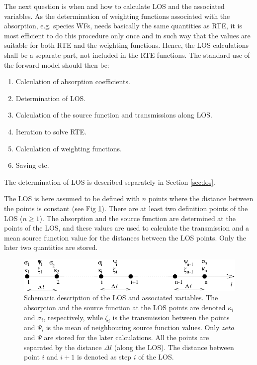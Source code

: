  The next question is when and how to calculate LOS and the associated
 variables. As the determination of weighting functions associated
 with the absorption, e.g. species WFs, needs basically the same
 quantities as RTE, it is most efficient to do this procedure only
 once and in such way that the values are suitable for both RTE and
 the weighting functions. Hence, the LOS calculations shall be a
 separate part, not included in the RTE functions. The standard use of
 the forward model should then be:
  \begin{enumerate}
    \item Calculation of absorption coefficients.
    \item Determination of LOS.
    \item Calculation of the source function and transmissions along LOS.
    \item Iteration to solve RTE.
    \item Calculation of weighting functions.
    \item Saving etc.
  \end{enumerate}
 The determination of LOS is described separately in Section \ref {sec:los}. 
  

  
 \label{sec:rte:iter}
 
 The LOS is here assumed to be defined with $n$ points where the
 distance between the points is constant (see Fig \ref{fig:rte:los}).
 There are at least two definition points of the LOS ($n\geq1$). The
 absorption and the source function are determined at the points of
 the LOS, and these values are used to calculate the transmission and a
 mean source function value for the distances between the LOS points.
 Only the later two quantities are stored.

  \begin{figure}
    \includegraphics*[width=0.98\hsize]{Figs/los}
    \caption{Schematic description of the LOS and associated variables.
      The absorption and the source function at the LOS points are
      denoted $\kappa_i$ and $\sigma_i$, respectively, while $\zeta_i$
      is the transmission between the points and $\Psi_i$ is the mean
      of neighbouring source function values. Only $zeta$ and $\Psi$
      are stored for the later calculations. All the points are
      separated by the distance $\Delta l$ (along the LOS). The distance
      between point $i$ and $i+1$ is denoted as step $i$ of the LOS. }
    \label{fig:rte:los}  
  \end{figure}

